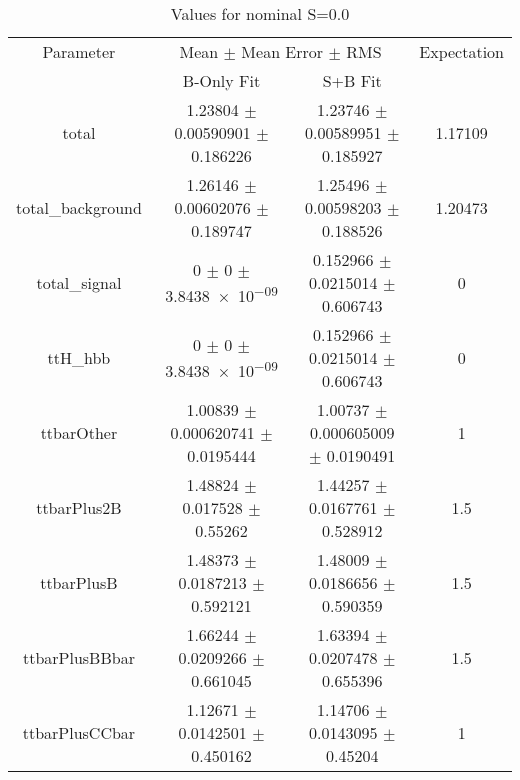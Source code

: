 \begin{table}
\centering
\caption{Values for nominal S=0.0}
\begin{tabular}{cccc}
\toprule
Parameter & \multicolumn{2}{c}{Mean $\pm$ Mean Error $\pm$ RMS} & Expectation\\
 & B-Only Fit & S+B Fit & \\
\midrule
total & \num{1.23804} $\pm$ \num{0.00590901} $\pm$ \num{0.186226} & \num{1.23746} $\pm$ \num{0.00589951} $\pm$ \num{0.185927} & \num{1.17109}\\
total\_background & \num{1.26146} $\pm$ \num{0.00602076} $\pm$ \num{0.189747} & \num{1.25496} $\pm$ \num{0.00598203} $\pm$ \num{0.188526} & \num{1.20473}\\
total\_signal & \num{0} $\pm$ \num{0} $\pm$ \num{3.8438e-09} & \num{0.152966} $\pm$ \num{0.0215014} $\pm$ \num{0.606743} & \num{0}\\
ttH\_hbb & \num{0} $\pm$ \num{0} $\pm$ \num{3.8438e-09} & \num{0.152966} $\pm$ \num{0.0215014} $\pm$ \num{0.606743} & \num{0}\\
ttbarOther & \num{1.00839} $\pm$ \num{0.000620741} $\pm$ \num{0.0195444} & \num{1.00737} $\pm$ \num{0.000605009} $\pm$ \num{0.0190491} & \num{1}\\
ttbarPlus2B & \num{1.48824} $\pm$ \num{0.017528} $\pm$ \num{0.55262} & \num{1.44257} $\pm$ \num{0.0167761} $\pm$ \num{0.528912} & \num{1.5}\\
ttbarPlusB & \num{1.48373} $\pm$ \num{0.0187213} $\pm$ \num{0.592121} & \num{1.48009} $\pm$ \num{0.0186656} $\pm$ \num{0.590359} & \num{1.5}\\
ttbarPlusBBbar & \num{1.66244} $\pm$ \num{0.0209266} $\pm$ \num{0.661045} & \num{1.63394} $\pm$ \num{0.0207478} $\pm$ \num{0.655396} & \num{1.5}\\
ttbarPlusCCbar & \num{1.12671} $\pm$ \num{0.0142501} $\pm$ \num{0.450162} & \num{1.14706} $\pm$ \num{0.0143095} $\pm$ \num{0.45204} & \num{1}\\
\bottomrule
\end{tabular}
\end{table}